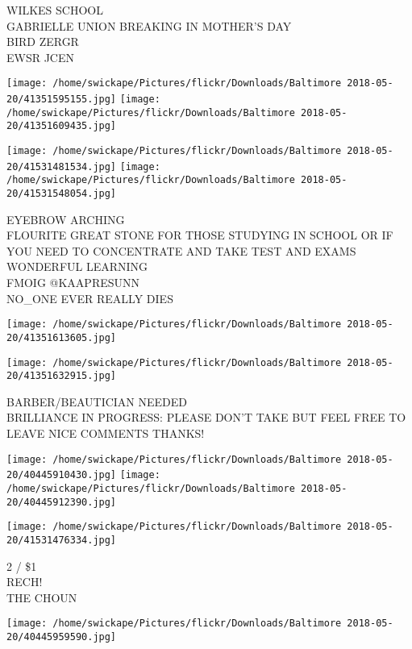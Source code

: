 \documentclass[10pt,letterpaper]{article}
\begin{document}
WILKES SCHOOL\\
GABRIELLE UNION BREAKING IN MOTHER'S DAY\\
BIRD ZERGR\\
EWSR JCEN\\
\pagebreak

\texttt{[image: /home/swickape/Pictures/flickr/Downloads/Baltimore 2018-05-20/41351595155.jpg]}
\texttt{[image: /home/swickape/Pictures/flickr/Downloads/Baltimore 2018-05-20/41351609435.jpg]}

\texttt{[image: /home/swickape/Pictures/flickr/Downloads/Baltimore 2018-05-20/41531481534.jpg]}
\texttt{[image: /home/swickape/Pictures/flickr/Downloads/Baltimore 2018-05-20/41531548054.jpg]}

EYEBROW ARCHING\\
FLOURITE GREAT STONE FOR THOSE STUDYING IN SCHOOL OR IF YOU NEED TO CONCENTRATE AND TAKE TEST AND EXAMS WONDERFUL LEARNING\\
FMOIG @KAAPRESUNN\\
NO\_ONE EVER  REALLY DIES\\
\pagebreak

\texttt{[image: /home/swickape/Pictures/flickr/Downloads/Baltimore 2018-05-20/41351613605.jpg]}

\vspace{0.25in}
\texttt{[image: /home/swickape/Pictures/flickr/Downloads/Baltimore 2018-05-20/41351632915.jpg]}

BARBER/BEAUTICIAN NEEDED\\
BRILLIANCE IN PROGRESS: PLEASE DON'T TAKE BUT FEEL FREE TO LEAVE NICE COMMENTS THANKS!\\
\pagebreak

\texttt{[image: /home/swickape/Pictures/flickr/Downloads/Baltimore 2018-05-20/40445910430.jpg]}
\texttt{[image: /home/swickape/Pictures/flickr/Downloads/Baltimore 2018-05-20/40445912390.jpg]}

\vspace{0.25in}
\texttt{[image: /home/swickape/Pictures/flickr/Downloads/Baltimore 2018-05-20/41531476334.jpg]}

2 / \$1\\
RECH!\\
THE CHOUN\\
\pagebreak

\texttt{[image: /home/swickape/Pictures/flickr/Downloads/Baltimore 2018-05-20/40445959590.jpg]}
\end{document}
